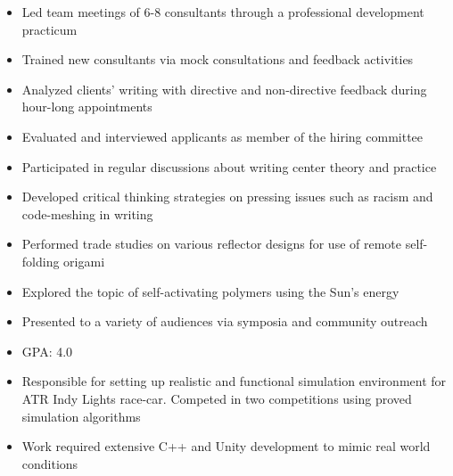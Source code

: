 \documentclass[10pt,a4paper,ragged2e,withhyper]{altacv}
\begin{document}
\begin{paracol}{2}
  \begin{itemize}
    \item Led team meetings of 6-8 consultants through a professional development practicum
    \item Trained new consultants via mock consultations and feedback activities
    \item Analyzed clients' writing with directive and non-directive feedback during hour-long appointments
    \item Evaluated and interviewed applicants as member of the hiring committee
    \item Participated in regular discussions about writing center theory and practice
    \item Developed critical thinking strategies on pressing issues such as racism and code-meshing in writing
  \end{itemize}
  \begin{itemize}
    \item Performed trade studies on various reflector designs for use of remote self-folding origami
    \item Explored the topic of self-activating polymers using the Sun's energy
    \item Presented to a variety of audiences via symposia and community outreach
  \end{itemize}

  \begin{itemize}
    \item GPA: 4.0
  \end{itemize}
  \divider


  \begin{itemize}
    \item Responsible for setting up realistic and functional simulation environment for ATR Indy Lights race-car. Competed in two competitions using proved simulation algorithms
    \item Work required extensive C++ and Unity development to mimic real world conditions
  \end{itemize}
  \divider


\end{paracol}
\end{document}
